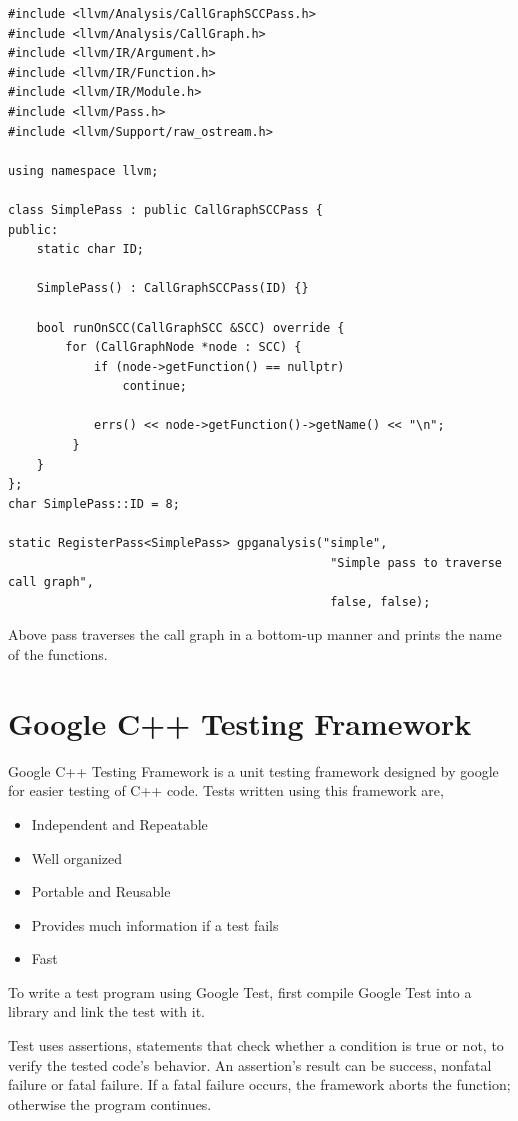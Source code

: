\documentclass[a4paper,12pt]{report}
\begin{document}
\begin{verbatim}
#include <llvm/Analysis/CallGraphSCCPass.h>
#include <llvm/Analysis/CallGraph.h>
#include <llvm/IR/Argument.h>
#include <llvm/IR/Function.h>
#include <llvm/IR/Module.h>
#include <llvm/Pass.h>
#include <llvm/Support/raw_ostream.h>

using namespace llvm;

class SimplePass : public CallGraphSCCPass {
public:
    static char ID;

    SimplePass() : CallGraphSCCPass(ID) {}

    bool runOnSCC(CallGraphSCC &SCC) override {
        for (CallGraphNode *node : SCC) {
            if (node->getFunction() == nullptr)
                continue;

            errs() << node->getFunction()->getName() << "\n";
         }
    }
};
char SimplePass::ID = 8;

static RegisterPass<SimplePass> gpganalysis("simple",
                                             "Simple pass to traverse call graph",
                                             false, false);
\end{verbatim}

Above pass traverses the call graph in a bottom-up manner and prints the name of the functions.

\section{Google C++ Testing Framework}
Google C++ Testing Framework \cite{Gtest} is a unit testing framework designed by google for easier
testing of C++ code. Tests written using this framework are,

\begin{itemize}
    \item Independent and Repeatable
    \item Well organized
    \item Portable and Reusable
    \item Provides much information if a test fails
    \item Fast
\end{itemize}

To write a test program using Google Test, first compile Google Test
into a library and link the test with it.

Test uses assertions, statements that check whether a condition is true or not,
to verify the tested code's behavior. An assertion's result can be success, nonfatal
failure or fatal failure. If a fatal failure occurs, the framework aborts the function;
otherwise the program continues.
\end{document}

